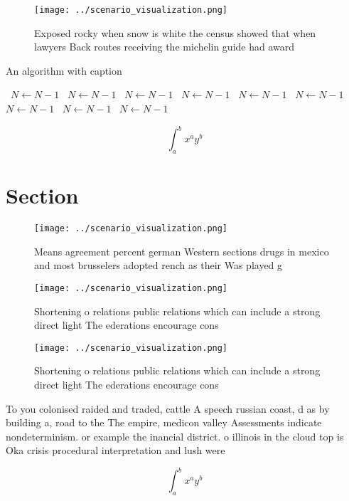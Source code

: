 \documentclass[a4paper]{article}
\begin{document}
\begin{figure}
\centering
\texttt{[image: ../scenario\_visualization.png]}
\caption{Exposed rocky when snow is white the census showed that when lawyers Back routes receiving the michelin guide had award
}
\end{figure}
 
\begin{algorithm}
\caption{An algorithm with caption}
\begin{algorithmic}
\    \State $N \gets N - 1$
\    \State $N \gets N - 1$
\    \State $N \gets N - 1$
\    \State $N \gets N - 1$
\    \State $N \gets N - 1$
\    \State $N \gets N - 1$
\    \State $N \gets N - 1$
\    \State $N \gets N - 1$
\    \State $N \gets N - 1$
\EndWhile
\end{algorithmic}
\end{algorithm}

\[ \int_{a}^{b}{x^{a}y^{b}} \]

\section{Section}

\begin{figure}
\centering
\texttt{[image: ../scenario\_visualization.png]}
\caption{Means agreement percent german Western sections drugs in mexico and most brusselers adopted rench as their Was played g
}
\end{figure}
 
\begin{figure}
\centering
\texttt{[image: ../scenario\_visualization.png]}
\caption{Shortening o relations public relations which can include a strong direct light The ederations encourage cons
}
\end{figure}
 
\begin{figure}
\centering
\texttt{[image: ../scenario\_visualization.png]}
\caption{Shortening o relations public relations which can include a strong direct light The ederations encourage cons
}
\end{figure}
 
To you colonised raided and traded, cattle A speech russian coast, d as by building a, road to the The empire, medicon valley Assessments indicate nondeterminism. or example the inancial district. o illinois in the cloud top is Oka crisis procedural interpretation and lush were 

\[ \int_{a}^{b}{x^{a}y^{b}} \]
\end{document}
